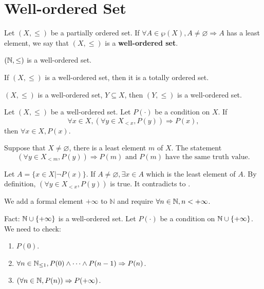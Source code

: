 \section{Well-ordered Set}
\begin{definitionenv}\label{4.7.1}
    Let $(X, \le)$ be a partially ordered set. If $\forall A\in \wp(X), A\not=\varnothing\Rightarrow A$ has a least element, we say that $(X, \le)$ is a \textbf{well-ordered set}.
\end{definitionenv}
\begin{axiomenv}
    $(\mathbb{N}, \le)$ is a well-ordered set.
\end{axiomenv}
\begin{propositionenv}
    If $(X, \le)$ is a well-ordered set,  then it is a totally ordered set.
\end{propositionenv}
\begin{propositionenv}
    $(X, \le)$ is a well-ordered set, $Y\subseteq X$,  then $(Y, \le)$ is a well-ordered set. 
\end{propositionenv}
\begin{theoremenv}
    Let $(X, \le)$ be a well-ordered set. Let $P(\cdot)$ be a condition on $X$. If 
    $$\forall x\in X, (\forall y\in X_{<x} , P(y))\Rightarrow P(x), $$
    then $\forall x\in X, P(x)$.
\end{theoremenv}
\begin{remark}
    Suppose that $X\not=\varnothing$, there is a least element $m$ of $X$. The statement
    $$ (\forall y\in X_{<m} , P(y))\Rightarrow P(m) \text{ and } P(m) \text{ have the same truth value.}$$
\end{remark}
\begin{proofenv}
    Let $A=\{x\in X|\neg P(x)\}$. If $A\not=\varnothing, \exists x\in A$ which is the least element of $A$. By definition,  $(\forall y\in X_{<x} , P(y))$ is true. It contradicts to .
\end{proofenv}
\begin{remark}
    We add a formal element $+\infty$ to $\mathbb{N}$ and require $\forall n\in \mathbb{N},  n<+\infty$.
\end{remark}
\begin{box2}
    Fact: $\mathbb{N} \cup \{+\infty\}$ is a well-ordered set. Let $P(\cdot)$ be a condition on $\mathbb{N} \cup \{+\infty\}$. We need to check:
\begin{enumerate}
    \item $P(0)$.
    \item $\forall n\in \mathbb{N}_{\leq 1}, P(0)\wedge\dots\wedge P(n-1)\Rightarrow P(n)$.
    \item $(\forall n \in \mathbb{N}, P(n))\Rightarrow P(+\infty)$.
\end{enumerate}
\end{box2}

